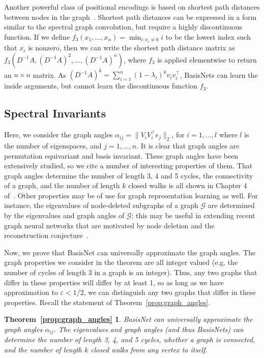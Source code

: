 \documentclass{article} \usepackage{iclr2023_conference,times}
\newcommand{\mc}[1]{\mathcal{#1}}
\newcommand\norm[1]{\lVert#1\rVert}
\begin{document}
Another powerful class of positional encodings is based on shortest path distances between nodes in the graph~\citep{ying2021transformers,li2020distance}. Shortest path distances can be expressed in a form similar to the spectral graph convolution, but require a highly discontinuous function. If we define $f_3(x_1, \ldots, x_n) = \min_{i : x_i \neq 0} i$ to be the lowest index such that $x_i$ is nonzero, then we can write the shortest path distance matrix as $f_3(D^{-1}A, (D^{-1}A)^2, \ldots, (D^{-1}A)^n)$, where $f_3$ is applied elementwise to return an $n \times n$ matrix. As $(D^{-1}A)^k = \sum_{i=1}^n (1-\lambda_i)^k v_i v_i^\top$, BasisNets can learn the inside arguments, but cannot learn the discontinuous function $f_3$.


\subsection{Spectral Invariants}\label{appendix:spectral_invariants}

Here, we consider the graph angles $\alpha_{ij} = \norm{V_i V_i^\top e_j}_2$, for $i = 1, \ldots, l$ where $l$ is the number of eigenspaces, and $j = 1, \ldots, n$. It is clear that graph angles are permutation equivariant and basis invariant. These graph angles have been extensively studied, so we cite a number of interesting properties of them. That graph angles determine the number of length 3, 4 and 5 cycles, the connectivity of a graph, and the number of length $k$ closed walks is all shown in Chapter 4 of~\cite{cvetkovic1997eigenspaces}. Other properties may be of use for graph representation learning as well. For instance, the eigenvalues of node-deleted subgraphs of a graph $\mc G$ are determined by the eigenvalues and graph angles of $\mc G$; this may be useful in extending recent graph neural networks that are motivated by node deletion and the reconstruction conjecture~\citep{cotta2021reconstruction,bevilacqua2021equivariant,papp2021dropgnn,tahmasebi2020counting}.

Now, we prove that BasisNet can universally approximate the graph angles. The graph properties we consider in the theorem are all integer valued (e.g. the number of cycles of length 3 in a graph is an integer). Thus, any two graphs that differ in these properties will differ by at least 1, so as long as we have approximation to $\varepsilon < 1/2$, we can distinguish any two graphs that differ in these properties. Recall the statement of Theorem~\ref{prop:graph_angles}.

\newtheorem*{prop:graph_angles}{Theorem~\ref{prop:graph_angles}}
\begin{prop:graph_angles}
    BasisNet can universally approximate the graph angles $\alpha_{ij}$. The eigenvalues and graph angles (and thus BasisNets) can determine the number of length 3, 4, and 5 cycles, whether a graph is connected, and the number of length $k$ closed walks from any vertex to itself.
\end{prop:graph_angles}
\end{document}
